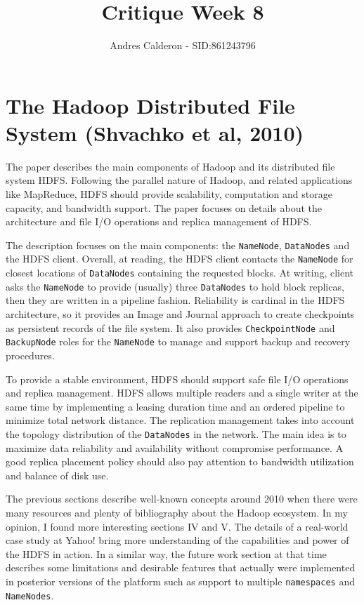 \documentclass[a4paper,10pt]{scrartcl}
\title{Critique Week 8}
\author{Andres Calderon - SID:861243796}
\begin{document}
\maketitle
\thispagestyle{empty}

\section*{The Hadoop Distributed File System (Shvachko et al, 2010)}
The paper describes the main components of Hadoop and its distributed file system HDFS.  Following the parallel nature of Hadoop, and related applications like MapReduce, HDFS should provide scalability, computation and storage capacity, and bandwidth support.  The paper focuses on details about the architecture and file I/O operations  and replica management of HDFS.

The description focuses on the main components: the \texttt{NameNode}, \texttt{DataNodes} and the HDFS client.  Overall, at reading, the HDFS client contacts the \texttt{NameNode} for closest locations of \texttt{DataNodes} containing the requested blocks.  At writing, client asks the \texttt{NameNode} to provide (usually) three \texttt{DataNodes} to hold block replicas, then they are written in a pipeline fashion.  Reliability is cardinal in the HDFS architecture, so it provides an Image and Journal approach to create checkpoints as persistent records of the file system.  It also provides \texttt{CheckpointNode} and \texttt{BackupNode} roles for the \texttt{NameNode} to manage and support backup and recovery procedures. 

To provide a stable environment, HDFS should support safe file I/O operations and replica management.  HDFS allows multiple readers and a single writer at the same time by implementing a leasing duration time and an ordered pipeline to minimize total network distance.  The replication management takes into account the topology distribution of the \texttt{DataNodes} in the network.  The main idea is to maximize data reliability and availability without compromise performance.  A good replica placement policy should also pay attention to bandwidth utilization and balance of disk use.

The previous sections describe well-known concepts around 2010 when there were many resources and plenty of bibliography about the Hadoop ecosystem. In my opinion, I found more interesting sections IV and V. The details of a real-world case study at Yahoo! bring more understanding of the capabilities and power of the HDFS in action.  In a similar way, the future work section at that time describes some limitations and desirable features that actually were implemented in posterior versions of the platform such as support to multiple \texttt{namespaces} and \texttt{NameNodes}.

\end{document}
